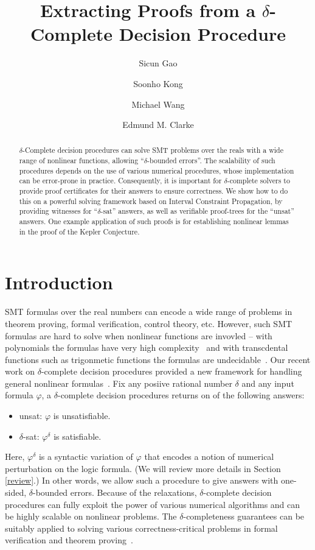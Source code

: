 \documentclass[envcountsect]{llncs}
\title{Extracting Proofs from a $\delta$-Complete Decision Procedure}
\author{Sicun Gao \and Soonho Kong \and Michael Wang \and Edmund M. Clarke}
\institute{Carnegie Mellon University, Pittsburgh, PA 15213}
\begin{document}
\maketitle

\begin{abstract}
$\delta$-Complete decision procedures can solve SMT problems over the
reals with a wide range of nonlinear functions, allowing ``$\delta$-bounded
errors''. The scalability of such procedures depends on the use of various
numerical procedures, whose implementation can be error-prone in practice.
Consequently, it is important for $\delta$-complete solvers to
provide proof certificates for their answers to ensure correctness. We show how to do this on a powerful solving framework based
on Interval Constraint Propagation, by providing witnesses for ``$\delta$-sat''
answers, as well as verifiable proof-trees for the ``unsat'' answers. One
example application of such proofs is for establishing nonlinear lemmas in the
proof of the Kepler Conjecture. 
\end{abstract}

\section{Introduction}

SMT formulas over the real numbers can encode a wide range of problems in 
theorem proving, formal verification, control theory, etc. However, such SMT
formulas are hard to solve when nonlinear functions are invovled -- with
polynomials the formulas have very high complexity~\cite{} and with
transcdental functions such as trigonmetic functions the formulas are
undecidable~\cite{}. Our recent work on $\delta$-complete decision procedures
provided a new framework for handling general nonlinear formulas~\cite{}. Fix
any posiive rational number $\delta$ and any input formula $\varphi$, a
$\delta$-complete decision procedures returns on of the following answers:
\begin{itemize}
 \item {\sf unsat}: $\varphi$ is unsatisfiable.
 \item {\sf $\delta$-sat}: $\varphi^{\delta}$ is satisfiable. 
\end{itemize}
Here, $\varphi^{\delta}$ is a syntactic variation of $\varphi$ that encodes a
notion of numerical perturbation on the logic formula. (We will review more 
details in Section \ref{review}.) In other words, we allow such a procedure to
give answers with one-sided, $\delta$-bounded errors. Because of the
relaxations, $\delta$-complete decision procedures can fully exploit the
power of various numerical algorithms and can be highly scalable on
nonlinear problems. The $\delta$-completeness guarantees can be suitably
applied to solving various correctness-critical problems in formal verification
and theorem proving~\cite{}. 
\end{document}
